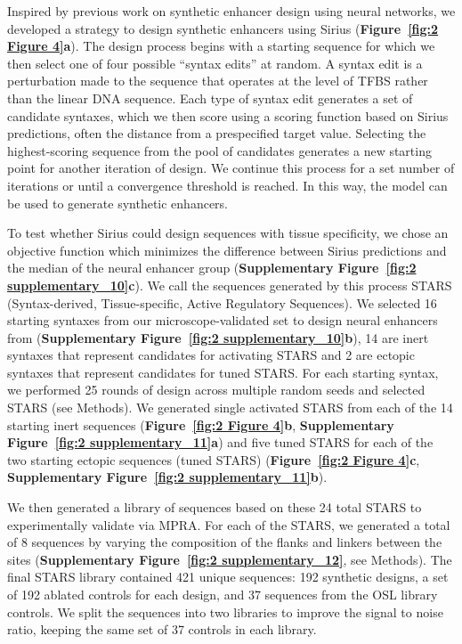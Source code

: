 Inspired by previous work on synthetic enhancer design using neural networks\cite{Taskiran2023-xz,Gosai2023-cw}, we developed a strategy to design synthetic enhancers using Sirius (\textbf{Figure~\ref{fig:2 Figure 4}a}). The design process begins with a starting sequence for which we then select one of four possible “syntax edits” at random. A syntax edit is a perturbation made to the sequence that operates at the level of TFBS rather than the linear DNA sequence. Each type of syntax edit generates a set of candidate syntaxes, which we then score using a scoring function based on Sirius predictions, often the distance from a prespecified target value. Selecting the highest-scoring sequence from the pool of candidates generates a new starting point for another iteration of design. We continue this process for a set number of iterations or until a convergence threshold is reached. In this way, the model can be used to generate synthetic enhancers.

To test whether Sirius could design sequences with tissue specificity, we chose an objective function which minimizes the difference between Sirius predictions and the median of the neural enhancer group (\textbf{Supplementary Figure~\ref{fig:2 supplementary_10}c}). We call the sequences generated by this process STARS (Syntax-derived, Tissue-specific, Active Regulatory Sequences). We selected 16 starting syntaxes from our microscope-validated set to design neural enhancers from (\textbf{Supplementary Figure~\ref{fig:2 supplementary_10}b}), 14 are inert syntaxes that represent candidates for activating STARS and 2 are ectopic syntaxes that represent candidates for tuned STARS. For each starting syntax, we performed 25 rounds of design across multiple random seeds and selected STARS (see Methods). We generated single activated STARS from each of the 14 starting inert sequences (\textbf{Figure~\ref{fig:2 Figure 4}b}, \textbf{Supplementary Figure~\ref{fig:2 supplementary_11}a}) and five tuned STARS for each of the two starting ectopic sequences (tuned STARS) (\textbf{Figure~\ref{fig:2 Figure 4}c}, \textbf{Supplementary Figure~\ref{fig:2 supplementary_11}b}).

We then generated a library of sequences based on these 24 total STARS to experimentally validate via MPRA. For each of the STARS, we generated a total of 8 sequences by varying the composition of the flanks and linkers between the sites (\textbf{Supplementary Figure~\ref{fig:2 supplementary_12}}, see Methods). The final STARS library contained 421 unique sequences: 192 synthetic designs, a set of 192 ablated controls for each design, and 37 sequences from the OSL library controls. We split the sequences into two libraries to improve the signal to noise ratio, keeping the same set of 37 controls in each library. 

